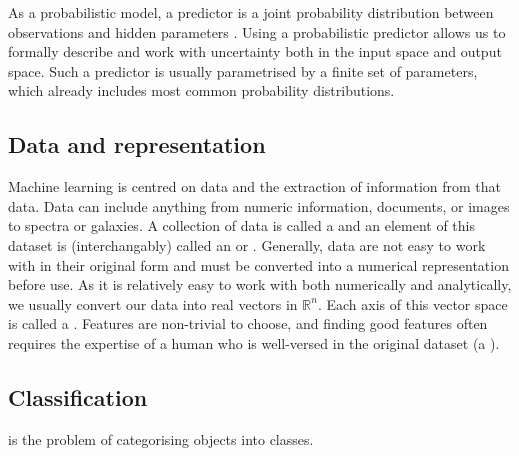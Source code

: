         As a probabilistic model, a predictor is a joint probability distribution between observations and hidden parameters \citep{deisenroth_mathematics_2020}. Using a probabilistic predictor allows us to formally describe and work with uncertainty both in the input space and output space. Such a predictor is usually parametrised by a finite set of parameters, which already includes most common probability distributions.

    \subsection{Data and representation}
    \label{sec:data-and-representation}

        Machine learning is centred on data and the extraction of information from that data. Data can include anything from numeric information, documents, or images to spectra or galaxies. A collection of data is called a  and an element of this dataset is (interchangably) called an  or . Generally, data are not easy to work with in their original form and must be converted into a numerical representation before use. As it is relatively easy to work with both numerically and analytically, we usually convert our data into real vectors in $\mathbb R^n$. Each axis of this vector space is called a . Features are non-trivial to choose, and finding good features often requires the expertise of a human who is well-versed in the original dataset (a ).
        



    \subsection{Classification}
    \label{sec:classification}

         is the problem of categorising objects into classes. 
